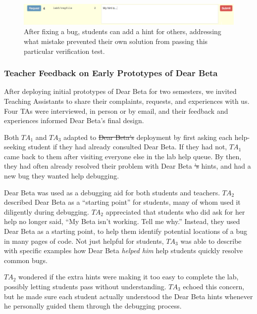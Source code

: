 \documentclass[12pt,twoside]{mitthesis}
\providecommand{\DIFaddtex}[1]{{\protect\color{blue}\uwave{#1}}} %
\providecommand{\DIFdeltex}[1]{{\protect\color{red}\sout{#1}}}                      %
\providecommand{\DIFaddbegin}{} %
\providecommand{\DIFaddend}{} %
\providecommand{\DIFdelbegin}{} %
\providecommand{\DIFdelend}{} %
\providecommand{\DIFadd}[1]{\texorpdfstring{\DIFaddtex{#1}}{#1}} %
\providecommand{\DIFdel}[1]{\texorpdfstring{\DIFdeltex{#1}}{}} %
\begin{document}
{{{{{{{{{{\begin{figure}
\bigskip
\centering
\includegraphics[width=1.0\columnwidth]{Body/figures/classoverflow/contrib_shortened.png}
\caption{After fixing a bug, students can add a hint for others, addressing what mistake prevented their own solution from passing this particular verification test.}
\label{fig:contrib}
\end{figure}

\subsubsection{Teacher Feedback on Early Prototypes of Dear Beta}

\DIFaddbegin 

\DIFaddend After deploying initial prototypes of Dear Beta for two semesters, we invited Teaching Assistants to share their complaints, requests, and experiences with us. Four TAs were interviewed, in person or by email, and their feedback and experiences informed Dear Beta's final design.

Both $TA_{1}$ and $TA_{3}$ adapted to \DIFdelbegin \DIFdel{Dear Beta's }\DIFdelend \DIFaddbegin \DIFadd{the Dear Beta }\DIFaddend deployment by first asking each help-seeking student if they had already consulted Dear Beta. If they had not, $TA_{1}$ came back to them after visiting everyone else in the lab help queue. By then, they had often already resolved their problem with Dear Beta \DIFdelbegin \DIFdel{'s }\DIFdelend hints, and had a new bug they wanted help debugging. 

Dear Beta was used as a debugging aid for both students and teachers. $TA_{2}$ described Dear Beta as a ``starting point'' for students, many of whom used it diligently during debugging. $TA_{2}$ appreciated that students who did ask for her help no longer said, ``My Beta isn't working. Tell me why.'' Instead, they used Dear Beta as a starting point, to help them identify potential locations of a bug in many pages of code. Not just helpful for students, $TA_{3}$ was able to describe with specific examples how Dear Beta \textit{helped him} help students quickly resolve common bugs.

$TA_{2}$ wondered if the extra hints were making it too easy to complete the lab, possibly letting students pass without understanding. $TA_{3}$ echoed this concern, but he made sure each student actually understood the Dear Beta hints whenever he personally guided them through the debugging process.

}}}}}}}}}}
\end{document}
